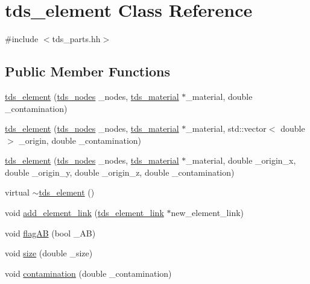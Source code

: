 \hypertarget{classtds__element}{}\section{tds\+\_\+element Class Reference}
\label{classtds__element}


{\ttfamily \#include $<$tds\+\_\+parts.\+hh$>$}

\subsection*{Public Member Functions}
\begin{DoxyCompactItemize}
\item 
\hyperlink{classtds__element_abcecf7331b6e9eb8901abef93626573d}{tds\+\_\+element} (\hyperlink{tds__parts_8hh_ad445cf91d41fc0e37fcaf259adec00ef}{tds\+\_\+nodes} \+\_\+nodes, \hyperlink{classtds__material}{tds\+\_\+material} $\ast$\+\_\+material, double \+\_\+contamination)
\item 
\hyperlink{classtds__element_aa29190be28bc10a7cc057707532bca21}{tds\+\_\+element} (\hyperlink{tds__parts_8hh_ad445cf91d41fc0e37fcaf259adec00ef}{tds\+\_\+nodes} \+\_\+nodes, \hyperlink{classtds__material}{tds\+\_\+material} $\ast$\+\_\+material, std\+::vector$<$ double $>$ \+\_\+origin, double \+\_\+contamination)
\item 
\hyperlink{classtds__element_acc981290ffd87bad402d32c4508dc5f4}{tds\+\_\+element} (\hyperlink{tds__parts_8hh_ad445cf91d41fc0e37fcaf259adec00ef}{tds\+\_\+nodes} \+\_\+nodes, \hyperlink{classtds__material}{tds\+\_\+material} $\ast$\+\_\+material, double \+\_\+origin\+\_\+x, double \+\_\+origin\+\_\+y, double \+\_\+origin\+\_\+z, double \+\_\+contamination)
\item 
virtual \hyperlink{classtds__element_a209f4917125e72c36d3285980d983892}{$\sim$tds\+\_\+element} ()
\item 
void \hyperlink{classtds__element_a9b3c0e1088fb7ae6da03e8fc1bf9c383}{add\+\_\+element\+\_\+link} (\hyperlink{classtds__element__link}{tds\+\_\+element\+\_\+link} $\ast$new\+\_\+element\+\_\+link)
\item 
void \hyperlink{classtds__element_ab8eb795822ab7e1ea47b703e4f5f473a}{flag\+AB} (bool \+\_\+\+AB)
\item 
void \hyperlink{classtds__element_adb36fa3ae80584e3a4fe12cfdedf6db6}{size} (double \+\_\+size)
\item 
void \hyperlink{classtds__element_a2b3e86e827be59f63cb8d561a73d6983}{contamination} (double \+\_\+contamination)

\end{DoxyCompactItemize}
